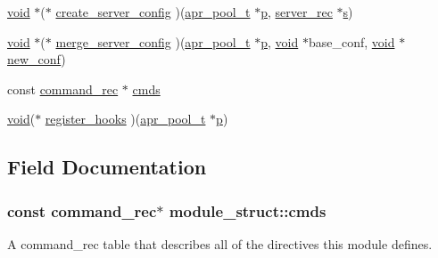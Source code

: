 \begin{DoxyCompactItemize}
\item 
\hyperlink{group__MOD__ISAPI_gacd6cdbf73df3d9eed42fa493d9b621a6}{void} $\ast$($\ast$ \hyperlink{structmodule__struct_a486e6f27e4b1d885fd4ea21f22b38a68}{create\+\_\+server\+\_\+config} )(\hyperlink{structapr__pool__t}{apr\+\_\+pool\+\_\+t} $\ast$\hyperlink{group__APACHE__CORE__MPM_ga5cd91701e5c167f2b1a38e70ab57817e}{p}, \hyperlink{structserver__rec}{server\+\_\+rec} $\ast$\hyperlink{pcretest_8txt_a062597889ba244b72877454b1d3adecf}{s})
\item 
\hyperlink{group__MOD__ISAPI_gacd6cdbf73df3d9eed42fa493d9b621a6}{void} $\ast$($\ast$ \hyperlink{structmodule__struct_a4bab1e811d95219325c24a431be75c6f}{merge\+\_\+server\+\_\+config} )(\hyperlink{structapr__pool__t}{apr\+\_\+pool\+\_\+t} $\ast$\hyperlink{group__APACHE__CORE__MPM_ga5cd91701e5c167f2b1a38e70ab57817e}{p}, \hyperlink{group__MOD__ISAPI_gacd6cdbf73df3d9eed42fa493d9b621a6}{void} $\ast$base\+\_\+conf, \hyperlink{group__MOD__ISAPI_gacd6cdbf73df3d9eed42fa493d9b621a6}{void} $\ast$\hyperlink{group__APACHE__CORE__CONFIG_gaceda73e293d0957789ffb6b971897fe6}{new\+\_\+conf})
\item 
const \hyperlink{group__APACHE__CORE__CONFIG_ga79f84e70f072880482a3fd004ae48710}{command\+\_\+rec} $\ast$ \hyperlink{structmodule__struct_ad2bdc0c0e8af7118b21bde0911c74cca}{cmds}
\item 
\hyperlink{group__MOD__ISAPI_gacd6cdbf73df3d9eed42fa493d9b621a6}{void}($\ast$ \hyperlink{structmodule__struct_a628b4e635e922228275919f1b595c105}{register\+\_\+hooks} )(\hyperlink{structapr__pool__t}{apr\+\_\+pool\+\_\+t} $\ast$\hyperlink{group__APACHE__CORE__MPM_ga5cd91701e5c167f2b1a38e70ab57817e}{p})
\end{DoxyCompactItemize}


\subsection{Field Documentation}
\subsubsection[{\texorpdfstring{cmds}{cmds}}]{\setlength{\rightskip}{0pt plus 5cm}const {\bf command\+\_\+rec}$\ast$ module\+\_\+struct\+::cmds}\hypertarget{structmodule__struct_ad2bdc0c0e8af7118b21bde0911c74cca}{}\label{structmodule__struct_ad2bdc0c0e8af7118b21bde0911c74cca}
A command\+\_\+rec table that describes all of the directives this module defines. 
